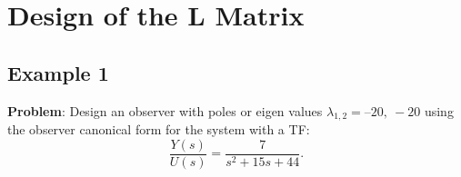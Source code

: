 
\ifslidesonly
\begin{slide}
   
\end{slide}
\fi



\ifslidesonly
\begin{slide}
   
\end{slide}
\fi
 

\ifslidesonly
\begin{slide}
   
\end{slide}
\fi


\section*{Design of the $\mathbf{L}$ Matrix} %
\label{sec:design_of_the_l_matrix}


\ifslidesonly
\begin{slide}
   
\end{slide}
\fi


\ifslidesonly
\begin{slide}
   
\end{slide}
\fi


\ifslidesonly
\begin{slide}
   
\end{slide}
\fi


\subsection*{Example 1} %
\label{sub:example_1}

\textbf{Problem}: Design an observer with poles or eigen values $\lambda_{1,2} = –20,\ −20$ using the observer canonical form for the system with a TF:
\[
\frac{Y(s)}{U(s)}=\frac{7}{s^2+15s+44}.
\]
 
